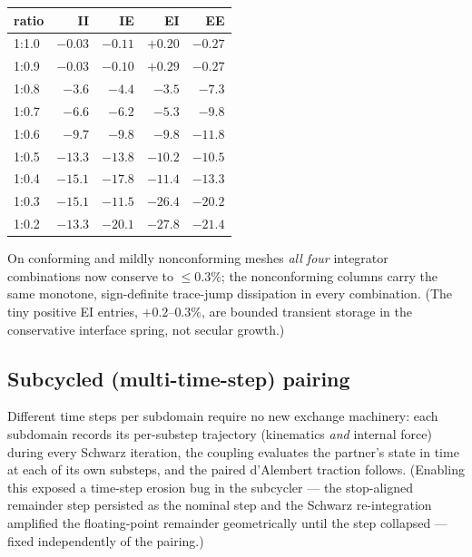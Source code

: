 \documentclass[11pt]{article}
\begin{document}
\begin{center}
\begin{tabular}{lrrrr}
\toprule
ratio & II & IE & EI & EE \\
\midrule
1:1.0 & $-0.03$ & $-0.11$ & $+0.20$ & $-0.27$ \\
1:0.9 & $-0.03$ & $-0.10$ & $+0.29$ & $-0.27$ \\
1:0.8 & $-3.6$ & $-4.4$ & $-3.5$ & $-7.3$ \\
1:0.7 & $-6.6$ & $-6.2$ & $-5.3$ & $-9.8$ \\
1:0.6 & $-9.7$ & $-9.8$ & $-9.8$ & $-11.8$ \\
1:0.5 & $-13.3$ & $-13.8$ & $-10.2$ & $-10.5$ \\
1:0.4 & $-15.1$ & $-17.8$ & $-11.4$ & $-13.3$ \\
1:0.3 & $-15.1$ & $-11.5$ & $-26.4$ & $-20.2$ \\
1:0.2 & $-13.3$ & $-20.1$ & $-27.8$ & $-21.4$ \\
\bottomrule
\end{tabular}
\end{center}

On conforming and mildly nonconforming meshes \emph{all four} integrator
combinations now conserve to $\le 0.3\%$; the nonconforming columns carry
the same monotone, sign-definite trace-jump dissipation in every
combination. (The tiny positive EI entries, $+0.2$--$0.3\%$, are bounded
transient storage in the conservative interface spring, not secular
growth.)

\subsection{Subcycled (multi-time-step) pairing}
\label{sec:subcycle}

Different time steps per subdomain require no new exchange machinery: each
subdomain records its per-substep trajectory (kinematics \emph{and}
internal force) during every Schwarz iteration, the coupling evaluates the
partner's state in time at each of its own substeps, and the paired
d'Alembert traction follows. (Enabling this exposed a time-step erosion bug
in the subcycler --- the stop-aligned remainder step persisted as the
nominal step and the Schwarz re-integration amplified the floating-point
remainder geometrically until the step collapsed --- fixed independently of
the pairing.)
\end{document}
